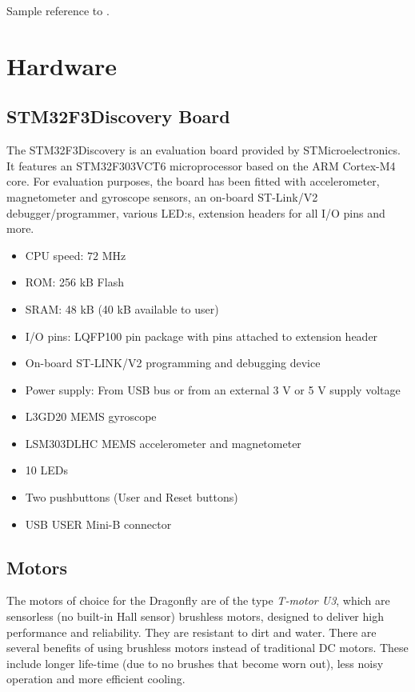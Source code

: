 \documentclass[a4paper]{article}
\begin{document}
Sample reference to \cite{stenberg}.

\section{Hardware}

\subsection{STM32F3Discovery Board}
The STM32F3Discovery is an evaluation board provided by STMicroelectronics. It features an STM32F303VCT6 microprocessor based on the ARM Cortex-M4 core. For evaluation purposes, the board has been fitted with accelerometer, magnetometer and gyroscope sensors, an on-board ST-Link/V2 debugger/programmer, various LED:s, extension headers for all I/O pins and more.

\begin{itemize}
  \item CPU speed: $72$ MHz
  \item ROM: 256 kB Flash
  \item SRAM: 48 kB (40 kB available to user)
  \item I/O pins: LQFP100 pin package with pins attached to extension header
  \item On-board ST-LINK/V2 programming and debugging device
  \item Power supply: From USB bus or from an external 3 V or 5 V supply voltage
  \item L3GD20 MEMS gyroscope
  \item LSM303DLHC MEMS accelerometer and magnetometer
  \item 10 LEDs
  \item Two pushbuttons (User and Reset buttons)
  \item USB USER Mini-B connector
\end{itemize}

\subsection{Motors}
The motors of choice for the Dragonfly are of the type \emph{T-motor U3}, which are sensorless (no built-in Hall sensor) brushless motors, designed to deliver high performance and reliability. They are resistant to dirt and water. There are several benefits of using brushless motors instead of traditional DC motors. These include longer life-time (due to no brushes that become worn out), less noisy operation and more efficient cooling.
\end{document}
